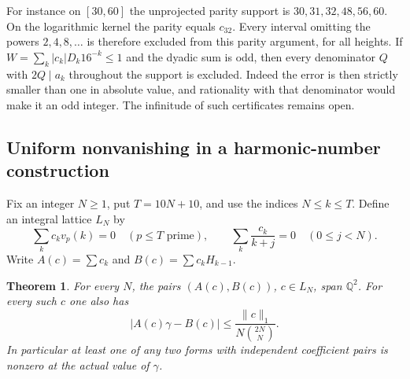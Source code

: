 \documentclass[11pt,a4paper]{article}
\newtheorem{theorem}{Theorem}[section]
\theoremstyle{definition}\newtheorem{definition}[theorem]{Definition}\newtheorem{example}[theorem]{Example}
\theoremstyle{remark}\newtheorem{remark}[theorem]{Remark}
\newcommand{\Q}{\mathbb Q}\newcommand{\Z}{\mathbb Z}\newcommand{\R}{\mathbb R}\newcommand{\N}{\mathbb N}
\begin{document}
For instance on $[30,60]$ the unprojected parity support is $30,31,32,48,56,60$. On the logarithmic kernel the parity equals $c_{32}$. Every interval omitting the powers $2,4,8,\ldots$ is therefore excluded from this parity argument, for all heights. If $W=\sum_k|c_k|D_k16^{-k}\le1$ and the dyadic sum is odd, then every denominator $Q$ with $2Q\mid a_k$ throughout the support is excluded. Indeed the error is then strictly smaller than one in absolute value, and rationality with that denominator would make it an odd integer. The infinitude of such certificates remains open.

\subsection{Uniform nonvanishing in a harmonic-number construction}
Fix an integer $N\ge1$, put $T=10N+10$, and use the indices $N\le k\le T$. Define an integral lattice $L_N$ by
\[
 \sum_k c_k v_p(k)=0\quad(p\le T\text{ prime}),\qquad
 \sum_k\frac{c_k}{k+j}=0\quad(0\le j<N).
\]
Write $A(c)=\sum c_k$ and $B(c)=\sum c_k H_{k-1}$.
\begin{theorem}
For every $N$, the pairs $(A(c),B(c))$, $c\in L_N$, span $\Q^2$. For every such $c$ one also has
\[
 |A(c)\gamma-B(c)|\le\frac{\|c\|_1}{N\binom{2N}{N}}.
\]
In particular at least one of any two forms with independent coefficient pairs is nonzero at the actual value of $\gamma$.
\end{theorem}
\end{document}
